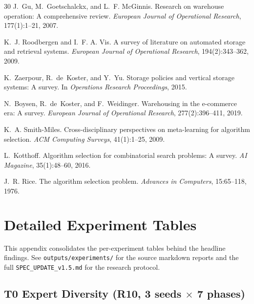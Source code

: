 \documentclass[11pt,a4paper]{article}
\begin{document}
\begin{thebibliography}{30}
J.~Gu, M.~Goetschalckx, and L.~F. McGinnis.
\newblock Research on warehouse operation: A comprehensive review.
\newblock \emph{European Journal of Operational Research},
  177(1):1--21, 2007.

K.~J. Roodbergen and I.~F. A. Vis.
\newblock A survey of literature on automated storage and retrieval
  systems.
\newblock \emph{European Journal of Operational Research},
  194(2):343--362, 2009.

K.~Zaerpour, R.~de~Koster, and Y.~Yu.
\newblock Storage policies and vertical storage systems: A survey.
\newblock In \emph{Operations Research Proceedings}, 2015.

N.~Boysen, R.~de~Koster, and F.~Weidinger.
\newblock Warehousing in the e-commerce era: A survey.
\newblock \emph{European Journal of Operational Research},
  277(2):396--411, 2019.

K.~A. Smith-Miles.
\newblock Cross-disciplinary perspectives on meta-learning for algorithm
  selection.
\newblock \emph{ACM Computing Surveys}, 41(1):1--25, 2009.

L.~Kotthoff.
\newblock Algorithm selection for combinatorial search problems: A survey.
\newblock \emph{AI Magazine}, 35(1):48--60, 2016.

J.~R. Rice.
\newblock The algorithm selection problem.
\newblock \emph{Advances in Computers}, 15:65--118, 1976.

\end{thebibliography}

\appendix

\section{Detailed Experiment Tables}
\label{sec:appendix}

This appendix consolidates the per-experiment tables behind the headline
findings. See \texttt{outputs/experiments/} for the source markdown reports
and the full \texttt{SPEC\_UPDATE\_v1.5.md} for the research protocol.

\subsection{T0 Expert Diversity (R10, 3 seeds $\times$ 7 phases)}
\end{document}
